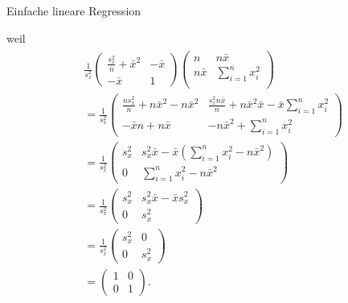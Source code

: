 \documentclass[
  8pt,
  ignorenonframetext,
]{beamer}
\begin{document}
\begin{frame}{Einfache lineare Regression}
\protect\hypertarget{einfache-lineare-regression-4}{}
\footnotesize

weil \begin{align}
\begin{split}
& \frac{1}{s_x^2}
\begin{pmatrix}
  \frac{s_x^2}{n} + \bar{x}^2
& -\bar{x}
\\
  -\bar{x}
&  1
\end{pmatrix}
\begin{pmatrix}
n           &  n\bar{x} \\
n\bar{x}    & \sum_{i=1}^n x_i^2\\
\end{pmatrix}
\\
& =
\frac{1}{s_x^2}
\begin{pmatrix}
\frac{ns_x^2}{n} + n\bar{x}^2 - n \bar{x}^2
& \frac{s_x^2n\bar{x}}{n} +n\bar{x}^2\bar{x} - \bar{x}\sum_{i=1}^n x_i^2
\\
-\bar{x}n + n \bar{x}
& - n\bar{x}^2 + \sum_{i=1}^n x_i^2
\end{pmatrix} \\
& =
\frac{1}{s_x^2}
\begin{pmatrix}
s_x^2
& s_x^2\bar{x} -\bar{x} \left(\sum_{i=1}^n x_i^2 - n\bar{x}^2\right)
\\
0
& \sum_{i=1}^n x_i^2 - n\bar{x}^2
\end{pmatrix}
\\
& =
\frac{1}{s_x^2}
\begin{pmatrix}
s_x^2
& s_x^2\bar{x} - \bar{x} s_x^2
\\
0
& s_x^2
\end{pmatrix}
\\
& =
\frac{1}{s_x^2}
\begin{pmatrix}
s_x^2
& 0
\\
0
& s_x^2
\end{pmatrix}
\\
& =
\begin{pmatrix}
1 & 0 \\ 0 & 1
\end{pmatrix}.
\end{split}
\end{align}
\end{frame}
\end{document}
